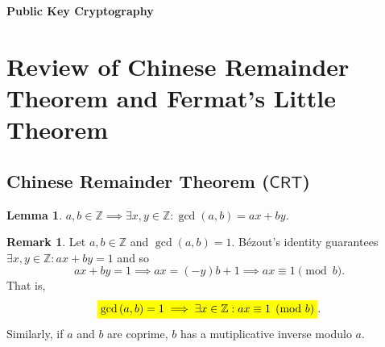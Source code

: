 \documentclass{article}
\newcommand{\mathcolorbox}[2]{\colorbox{#1}{$\displaystyle #2$}}
\newtheorem*{lemma*}{Lemma}
\theoremstyle{definition}
\newtheorem*{remark}{Remark}
\newcommand{\Z}{\mathbb{Z}}
\newcommand{\of}[1]{\left( #1 \right)}
\begin{document}
\begin{center}
	\huge\textbf{Public Key Cryptography}\\
	\vspace{0.5em}
\end{center}


\section{Review of Chinese Remainder Theorem and Fermat's Little Theorem}
\subsection{Chinese Remainder Theorem ($\mathsf{CRT}$)}

\begin{tcolorbox}[colback=white,colframe=lemcolor,arc=5pt,title={\color{white}\bf Bézout's Identity}]
	\begin{lemma*}
		$a,b\in\Z\implies\exists x,y\in\Z:\gcd\of{a,b}=ax+by$.
	\end{lemma*}
\end{tcolorbox}
\begin{remark}
	Let $a,b\in\Z$ and $\gcd\of{a,b}=1$. Bézout's identity guarantees $\exists x,y\in\Z:ax+by=1$ and so \[
	ax+by=1\implies ax=(-y)b+1\implies ax\equiv1\pmod{b}.
	\] That is, \[
	\mathcolorbox{-blue}{\gcd\of{a,b}=1\implies\exists x\in\Z:ax\equiv1\pmod{b}}.
	\] Similarly, if $a$ and $b$ are coprime, $b$ has a mutiplicative inverse modulo $a$.
\end{remark}
\end{document}
